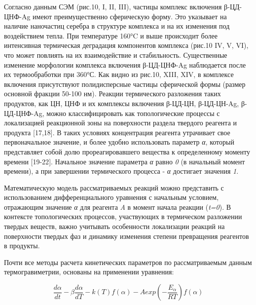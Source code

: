 \begin{multicols}{2}
Согласно данным СЭМ (рис.10, I, II, III), частицы комплекс включения
β-ЦД-ЦНФ-Ag имеют преимущественно сферическую форму. Это указывает на
наличие наночастиц серебра в структуре комплекса и на их изменения под
воздействием тепла. При температуре 160°C и выше происходит более
интенсивная термическая деградация компонентов комплекса (рис.10 IV, V,
VI), что может повлиять на их взаимодействие и стабильность.
Существенные изменение морфологии комплекса включения β-ЦД-ЦНФ-Ag
наблюдается после их термообработки при 360°С. Как видно из рис.10,
XIII, XIV, в комплексе включения присутствуют полидисперсные частицы
сферической формы (размер основной фракции 50-100 нм). Реакции
термического разложения таких продуктов, как ЦН, ЦНФ и их комплексы
включения β-ЦД-ЦН, β-ЦД-ЦН-Ag, β-ЦД-ЦНФ-Ag, можно классифицировать как
топологические процессы с локализацией реакционной зоны на поверхности
раздела твердого реагента и продукта {[}17,18{]}. В таких условиях
концентрация реагента утрачивает свое первоначальное значение, и более
удобно использовать параметр \emph{α}, который представляет собой долю
прореагировавшего вещества к определенному моменту времени {[}19-22{]}.
Начальное значение параметра \emph{α} равно \emph{0} (в начальный момент
времени), а при завершении термического процесса - \emph{α} достигает
значения \emph{1}.

Математическую модель рассматриваемых реакций можно представить с
использованием дифференциального уравнения с начальным условием,
отражающим значение \emph{α} для реагента \emph{A} в момент начала
реакции (\emph{t=0}). В контексте топологических процессов, участвующих
в термическом разложении твердых веществ, важно учитывать особенности
локализации реакций на поверхности твердых фаз и динамику изменения
степени превращения реагентов в продукты.

Почти все методы расчета кинетических параметров по рассматриваемым
данным термогравиметрии, основаны на применении уравнения:

\begin{equation}
\frac{d\alpha}{dt}-\beta\frac{d\alpha}{dT}-k(T)f(\alpha)-Aexp(-\frac{E_\alpha}{RT})f(\alpha)
\end{equation}
\end{multicols}

\hfill
{}
\figend

